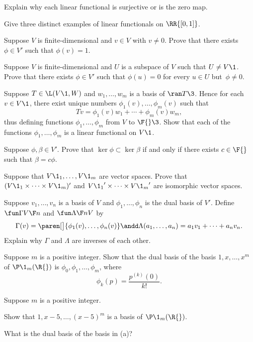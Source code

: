 
\exercise
Explain why each linear functional is surjective or is the zero map.


\exercise
Give three distinct examples of linear functionals on $\RR{[0,1]}$.


\exercise
Suppose $V$ is finite-dimensional and $v \in V$ with $v \ne 0$. Prove that there exists $\phi \in V'$ such that $\phi(v) = 1$. \label{HB1}


\exercise  \label{4321}
Suppose $V$ is finite-dimensional and $U$ is a subspace of $V$ such that $U \ne V\1$. Prove that there exists $\phi \in V'$ such that $\phi(u) = 0$ for every $u \in U$ but~$\phi \ne 0$.


\exercise
Suppose $T \in \L(V\1, W)$ and $w_1, \ldots, w_m$ is a basis of $\ran T\3$. Hence for each $v \in V\1$, there exist unique numbers
$\phi_1(v), \ldots, \phi_m(v)$ such that
\[
Tv = \phi_1(v) w_1 + \cdots + \phi_m(v) w_m,
\]
thus defining functions $\phi_1, \ldots, \phi_m$ from $V$ to $\F{}\3$.
Show that each of the functions $\phi_1, \ldots, \phi_m$ is a linear functional on $V\1$.


\exercise
Suppose $\phi, \beta \in V'\!$. Prove that $\ker \phi \subset \ker \beta$ if and only if there exists $c \in \F{}$ such that $\beta = c \phi$.\label{7nullsub}


\exercise
Suppose that $V\1_1, \ldots, V\1_m$ are vector spaces. Prove that $(V\1_1 \times \dots \times V\1_m)'$ and ${V\1_1}' \times \dots \times {V\1_m}'$ are isomorphic vector spaces.


\exercise
Suppose $v_1, \ldots, v_n$ is a basis of $V$ and $\phi_1, \ldots, \phi_n$ is the dual basis of $V'\!$. Define $\fun \Gamma  V {\F n}$ and
$\fun \Lambda {\F n} V$ by
\[
\Gamma(v) = \paren[\big]{ \phi_1(v), \ldots, \phi_n(v) }
\andd
\Lambda(a_1, \ldots, a_n) = a_1 v_1 + \cdots + a_n v_n.
\]
Explain why $\Gamma$ and $\Lambda$ are inverses of each other.


\exercise
Suppose $m$ is a positive integer. Show that the dual basis of the basis $1, x, \dots, x^m$ of $\P\1_m(\R{})$ is $\phi_0, \phi_1, \dots, \phi_m$, where
\[
\phi_k(p) = \frac{p^{(k)}(0)}{k!}.
\]


\exercise
Suppose $m$ is a positive integer.
\begin{subtheorem}
\item
Show that $1, x-5, \dots, (x-5)^m$ is a basis of $\P\1_m(\R{})$.
\item
What is the dual basis of the basis in (a)?
\end{subtheorem}
\exercisesubtheoremend


